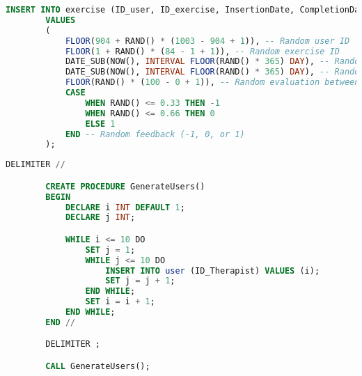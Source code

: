 \documentclass{article}
\begin{document}
    \pagebreak
    \begin{lstlisting}[language=SQL, breaklines, caption=Generazione Casuale esecuzione esercizio]
        INSERT INTO exercise (ID_user, ID_exercise, InsertionDate, CompletionDate, Evaluation, Feedback)
        VALUES
        (
            FLOOR(904 + RAND() * (1003 - 904 + 1)), -- Random user ID
            FLOOR(1 + RAND() * (84 - 1 + 1)), -- Random exercise ID
            DATE_SUB(NOW(), INTERVAL FLOOR(RAND() * 365) DAY), -- Random date within the past year
            DATE_SUB(NOW(), INTERVAL FLOOR(RAND() * 365) DAY), -- Random completion date within the past year
            FLOOR(RAND() * (100 - 0 + 1)), -- Random evaluation between 0 and 100
            CASE
                WHEN RAND() <= 0.33 THEN -1
                WHEN RAND() <= 0.66 THEN 0
                ELSE 1
            END -- Random feedback (-1, 0, or 1)
        );
    \end{lstlisting}

    \begin{lstlisting}[language=SQL, breaklines, caption=Generazione degli utenti]
        DELIMITER //

        CREATE PROCEDURE GenerateUsers()
        BEGIN
            DECLARE i INT DEFAULT 1;
            DECLARE j INT;

            WHILE i <= 10 DO
                SET j = 1;
                WHILE j <= 10 DO
                    INSERT INTO user (ID_Therapist) VALUES (i);
                    SET j = j + 1;
                END WHILE;
                SET i = i + 1;
            END WHILE;
        END //

        DELIMITER ;

        CALL GenerateUsers();
    \end{lstlisting}
\pagebreak
\end{document}
